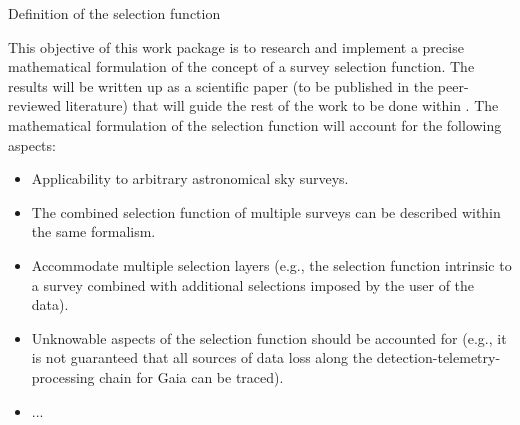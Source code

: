 \begin{workpackage}{Definition of the selection function}
  \label{wp:selfundefinition}
  
  \makewptable %

  \begin{wpobjectives}
    This objective of this work package is to research and implement a precise mathematical formulation of the concept of a survey selection function. The results will be written up as a scientific paper (to be published in the peer-reviewed literature) that will guide the rest of the work to be done within {\acro}.  The mathematical formulation of the selection function will account for the following aspects:
    \begin{itemize}
        \item Applicability to arbitrary astronomical sky surveys.
        \item The combined selection function of multiple surveys can be described within the same formalism.
        \item Accommodate multiple selection layers (e.g., the selection function intrinsic to a survey combined with additional selections imposed by the user of the data).
        \item Unknowable aspects of the selection function should be accounted for (e.g., it is not guaranteed that all sources of data loss along the detection-telemetry-processing chain for Gaia can be traced). 
        \item ...
    \end{itemize}
  \end{wpobjectives}

  \begin{wpdescription}



\end{wpdescription}
\end{workpackage}
